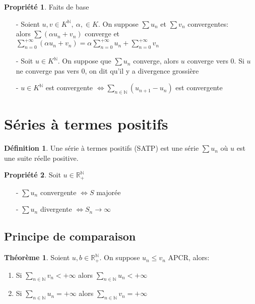 \documentclass[fleqn]{article}
\theoremstyle{definition} \newtheorem*{defi}{D\'efinition}
\theoremstyle{definition} \newtheorem*{theo}{Th\'eor\`eme}
\theoremstyle{definition} \newtheorem*{coro}{Corollaire}
\theoremstyle{remark} \newtheorem*{rqs}{Remarques}
\theoremstyle{definition} \newtheorem*{prop}{Propri\'et\'e}
\begin{document}
\begin{prop} Faits de base
	\begin{enumerate}
		\item [-] Soient $u,v \in K^{\mathbb{N}},\ \alpha, \in K$. On suppose $\sum u_n$ et $\sum v_n$ convergentes:\\
			alors $\sum(\alpha u_n + v_n)$ converge et $\sum_{n=0}^{+\infty} (\alpha u_n + v_n) = \alpha \sum_{n=0}^{+\infty} u_n +
			\sum_{n=0}^{+\infty} v_n$
		\item [-] Soit $u \in K^\mathbb{N}$. On suppose que $\sum u_n$ converge, alors $u$ converge vers $0$. Si $u$ ne converge pas vers $0$,
			on dit qu'il y a divergence grossi\`ere
		\item [-] $u \in K^\mathbb{N}$ est convergente $\Leftrightarrow \sum_{n \in \mathbb{N}} (u_{n+1} - u_n)$ est convergente
	\end{enumerate}
\end{prop}

\section{S\'eries \`a termes positifs}
\begin{defi}
Une s\'erie \`a termes positifs (SATP) est une s\'erie $\sum u_n$ o\`u $u$ est une suite r\'eelle positive.
\end{defi}

\begin{prop} Soit $u \in \mathbb{R}_{+}^{\mathbb{N}}$
	\begin{enumerate}
		\item [-] $\sum u_n$ convergente $\Leftrightarrow S$ major\'ee
		\item [-] $\sum u_n$ divergente $\Leftrightarrow S_n \rightarrow \infty$
	\end{enumerate}
\end{prop}

\subsection{Principe de comparaison}
\begin{theo} Soient $u,b \in \mathbb{R}_+^{\mathbb{N}}$. On suppose $u_n \leq v_n$ APCR, alors:
\begin{enumerate}
	\item Si $\sum_{n \in \mathbb{N}} v_n < +\infty$ alors $\sum_{n \in \mathbb{N}} u_n < +\infty$
	\item Si $\sum_{n \in \mathbb{N}} u_n = +\infty$ alors $\sum_{n \in \mathbb{N}} v_n = +\infty$
\end{enumerate}
\end{theo}
\end{document}
